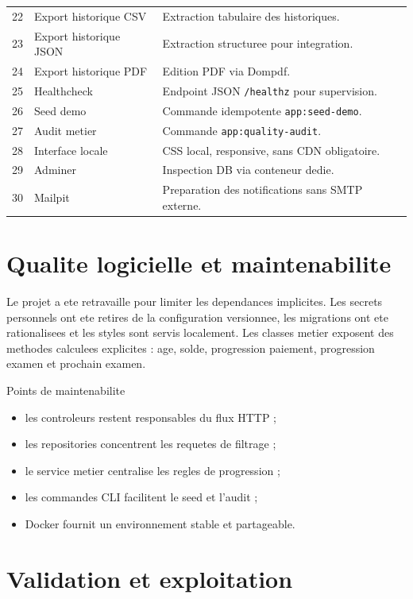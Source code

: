 \documentclass[11pt,a4paper]{article}
\newenvironment{compactitem}{\begin{itemize}[leftmargin=1.2em,itemsep=3pt,topsep=2pt]}{\end{itemize}}
\begin{document}
\begin{longtable}{p{0.9cm}p{5.1cm}p{8.4cm}}
22 & Export historique CSV & Extraction tabulaire des historiques. \\
23 & Export historique JSON & Extraction structuree pour integration. \\
24 & Export historique PDF & Edition PDF via Dompdf. \\
25 & Healthcheck & Endpoint JSON \texttt{/healthz} pour supervision. \\
26 & Seed demo & Commande idempotente \texttt{app:seed-demo}. \\
27 & Audit metier & Commande \texttt{app:quality-audit}. \\
28 & Interface locale & CSS local, responsive, sans CDN obligatoire. \\
29 & Adminer & Inspection DB via conteneur dedie. \\
30 & Mailpit & Preparation des notifications sans SMTP externe. \\
\bottomrule
\end{longtable}

\section{Qualite logicielle et maintenabilite}

Le projet a ete retravaille pour limiter les dependances implicites. Les secrets personnels ont ete retires de la configuration versionnee, les migrations ont ete rationalisees et les styles sont servis localement. Les classes metier exposent des methodes calculees explicites : age, solde, progression paiement, progression examen et prochain examen.

\begin{infobox}{Points de maintenabilite}
\begin{compactitem}
  \item les controleurs restent responsables du flux HTTP ;
  \item les repositories concentrent les requetes de filtrage ;
  \item le service metier centralise les regles de progression ;
  \item les commandes CLI facilitent le seed et l'audit ;
  \item Docker fournit un environnement stable et partageable.
\end{compactitem}
\end{infobox}

\section{Validation et exploitation}
\end{document}
